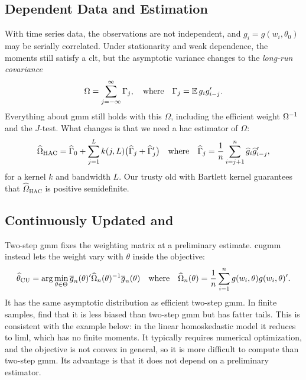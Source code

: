 \documentclass[a4paper,12pt]{article}
\begin{document}
\subsection{Dependent Data and  Estimation}\label{sec-hac}

With time series data, the observations are not independent, and $g_i=g(w_i,\theta_0)$ may be serially correlated.
Under stationarity and weak dependence, the moments still satisfy a \gls{clt}, but the asymptotic variance changes to the \emph{long-run covariance}
\begin{align}
	\Omega=\sum_{j=-\infty}^{\infty}\Gamma_j,
	\quad\text{where}\quad
	\Gamma_j=\operatorname{\mathbb{E}} g_ig_{i-j}^{\prime}.
\end{align}
Everything about \gls{gmm} still holds with this $\Omega$,
including the efficient weight $\Omega^{-1}$ and the $J$-test.
What changes is that we need a \gls{hac} estimator of $\Omega$:
\begin{align}
	\widehat\Omega_{\mathrm{HAC}}=\widehat\Gamma_0+\sum_{j=1}^Lk(j,L)\bigl(\widehat\Gamma_j+\widehat\Gamma_j^{\prime}\bigr)
	\quad\text{where}\quad
	\widehat\Gamma_j=\frac1n\sum_{i=j+1}^n\widehat g_i\widehat g_{i-j}^{\prime},
\end{align}
for a kernel $k$ and bandwidth $L$.
Our trusty old \textcite{newey-west-1987} with Bartlett kernel guarantees that $\widehat\Omega_{\mathrm{HAC}}$ is positive semidefinite.

\subsection{Continuously Updated  and }\label{sec-cugmm}

Two-step \gls{gmm} fixes the weighting matrix at a preliminary estimate.
\gls{cugmm} \parencite{hansen-heaton-yaron-1996} instead lets the weight vary with $\theta$ inside the objective:
\begin{align}
	\widehat\theta_{\mathrm{CU}}=\arg\min_{\theta\in\Theta}\overline g_n(\theta)^{\prime}\widehat\Omega_n(\theta)^{-1}\overline g_n(\theta)
	\quad\text{where}\quad
	\widehat\Omega_n(\theta)=\frac1n\sum_{i=1}^ng(w_i,\theta)g(w_i,\theta)^{\prime}.
\end{align}
It has the same asymptotic distribution as efficient two-step \gls{gmm}.
In finite samples, \textcite{hansen-heaton-yaron-1996} find that it is less biased than two-step \gls{gmm} but has fatter tails.
This is consistent with the example below: in the linear homoskedastic model it reduces to \gls{liml}, which has no finite moments.
It typically requires numerical optimization, and the objective is not convex in general,
so it is more difficult to compute than two-step \gls{gmm}.
Its advantage is that it does not depend on a preliminary estimator.
\end{document}
